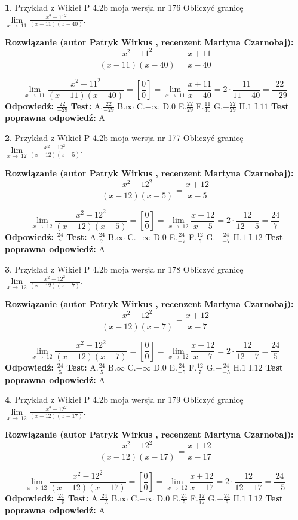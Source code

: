 \documentclass[12pt, a4paper]{article}
\theoremstyle{definition} %
\newtheorem{zad}{}
\newcommand{\zadStart}[1]{\begin{zad}#1\newline}
\newcommand{\zadStop}{\end{zad}}
\newcommand{\rozwStart}[2]{\noindent \textbf{Rozwiązanie (autor #1 , recenzent #2): }\newline}
\newcommand{\rozwStop}{\newline}
\newcommand{\odpStart}{\noindent \textbf{Odpowiedź:}\newline}
\newcommand{\odpStop}{\newline}
\newcommand{\testStart}{\noindent \textbf{Test:}\newline}
\newcommand{\testStop}{\newline}
\newcommand{\kluczStart}{\noindent \textbf{Test poprawna odpowiedź:}\newline}
\newcommand{\kluczStop}{\newline}
\begin{document}
\zadStart{Przykład z Wikieł P 4.2b moja wersja nr 176}
Obliczyć granicę $\lim\limits_{x\to\ 11}\frac{x^{2}-11^{2}}{(x-11)(x-40)}$.
\zadStop
\rozwStart{Patryk Wirkus}{Martyna Czarnobaj}
$$\frac{x^{2}-11^{2}}{(x-11)(x-40)}=\frac{x+11}{x-40}$$

$$\lim\limits_{x\to\ 11}\frac{x^{2}-11^{2}}{(x-11)(x-40)}=[\frac{0}{0}]=\lim\limits_{x\to\ 11}\frac{x+11}{x-40}=2 \cdot \frac{11}{11-40} = \frac{22}{-29}$$
\rozwStop
\odpStart
$\frac{22}{-29}$
\odpStop
\testStart
A.$\frac{22}{-29}$
B.$\infty$
C.$-\infty$
D.$0$
E.$\frac{22}{29}$
F.$\frac{11}{40}$
G.$-\frac{22}{29}$
H.$1$
I.$11$
\testStop
\kluczStart
A
\kluczStop



\zadStart{Przykład z Wikieł P 4.2b moja wersja nr 177}
Obliczyć granicę $\lim\limits_{x\to\ 12}\frac{x^{2}-12^{2}}{(x-12)(x-5)}$.
\zadStop
\rozwStart{Patryk Wirkus}{Martyna Czarnobaj}
$$\frac{x^{2}-12^{2}}{(x-12)(x-5)}=\frac{x+12}{x-5}$$

$$\lim\limits_{x\to\ 12}\frac{x^{2}-12^{2}}{(x-12)(x-5)}=[\frac{0}{0}]=\lim\limits_{x\to\ 12}\frac{x+12}{x-5}=2 \cdot \frac{12}{12-5} = \frac{24}{7}$$
\rozwStop
\odpStart
$\frac{24}{7}$
\odpStop
\testStart
A.$\frac{24}{7}$
B.$\infty$
C.$-\infty$
D.$0$
E.$\frac{24}{-7}$
F.$\frac{12}{5}$
G.$-\frac{24}{-7}$
H.$1$
I.$12$
\testStop
\kluczStart
A
\kluczStop



\zadStart{Przykład z Wikieł P 4.2b moja wersja nr 178}
Obliczyć granicę $\lim\limits_{x\to\ 12}\frac{x^{2}-12^{2}}{(x-12)(x-7)}$.
\zadStop
\rozwStart{Patryk Wirkus}{Martyna Czarnobaj}
$$\frac{x^{2}-12^{2}}{(x-12)(x-7)}=\frac{x+12}{x-7}$$

$$\lim\limits_{x\to\ 12}\frac{x^{2}-12^{2}}{(x-12)(x-7)}=[\frac{0}{0}]=\lim\limits_{x\to\ 12}\frac{x+12}{x-7}=2 \cdot \frac{12}{12-7} = \frac{24}{5}$$
\rozwStop
\odpStart
$\frac{24}{5}$
\odpStop
\testStart
A.$\frac{24}{5}$
B.$\infty$
C.$-\infty$
D.$0$
E.$\frac{24}{-5}$
F.$\frac{12}{7}$
G.$-\frac{24}{-5}$
H.$1$
I.$12$
\testStop
\kluczStart
A
\kluczStop



\zadStart{Przykład z Wikieł P 4.2b moja wersja nr 179}
Obliczyć granicę $\lim\limits_{x\to\ 12}\frac{x^{2}-12^{2}}{(x-12)(x-17)}$.
\zadStop
\rozwStart{Patryk Wirkus}{Martyna Czarnobaj}
$$\frac{x^{2}-12^{2}}{(x-12)(x-17)}=\frac{x+12}{x-17}$$

$$\lim\limits_{x\to\ 12}\frac{x^{2}-12^{2}}{(x-12)(x-17)}=[\frac{0}{0}]=\lim\limits_{x\to\ 12}\frac{x+12}{x-17}=2 \cdot \frac{12}{12-17} = \frac{24}{-5}$$
\rozwStop
\odpStart
$\frac{24}{-5}$
\odpStop
\testStart
A.$\frac{24}{-5}$
B.$\infty$
C.$-\infty$
D.$0$
E.$\frac{24}{5}$
F.$\frac{12}{17}$
G.$-\frac{24}{5}$
H.$1$
I.$12$
\testStop
\kluczStart
A
\kluczStop
\end{document}
